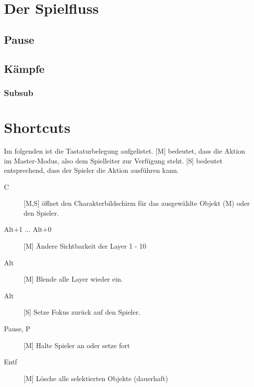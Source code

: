 \documentclass[german,10pt,a4paper,twocolumn,colorscheme=darkblue]{orarticle}
\begin{document}
	\section{Der Spielfluss}
	
		\subsection{Pause}
		\subsection{Kämpfe}
			\subsubsection{Subsub}
			
	\section{Shortcuts}
		Im folgenden ist die Tastaturbelegung aufgelistet. [M] bedeutet, dass die Aktion im Master-Modus, also dem Spielleiter zur Verfügung steht. [S] bedeutet entsprechend, dass der Spieler die Aktion ausführen kann.
		\begin{description}
			\item[C] [M,S] öffnet den Charakterbildschirm für das ausgewählte Objekt (M) oder den Spieler.
			\item[Alt+1 ... Alt+0] [M] Ändere Sichtbarkeit der Layer 1 - 10
			\item[Alt] [M] Blende alle Layer wieder ein.
			\item[Alt] [S] Setze Fokus zurück auf den Spieler.
			\item[Pause, P] [M] Halte Spieler an oder setze fort
			\item[Entf] [M] Lösche alle selektierten Objekte (dauerhaft)
		\end{description}
	
	
\end{document}
